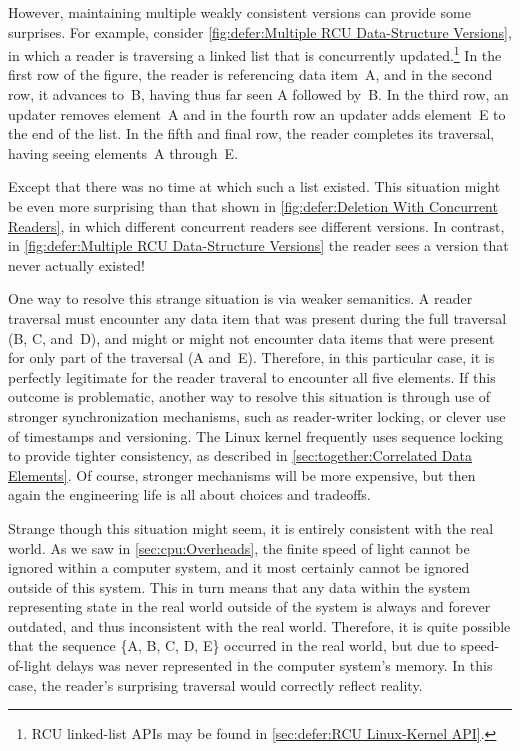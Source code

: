 However, maintaining multiple weakly consistent versions can provide
some surprises.
For example, consider
\cref{fig:defer:Multiple RCU Data-Structure Versions},
in which a reader is traversing a linked list that is concurrently
updated.\footnote{
	RCU linked-list APIs may be found in
	\cref{sec:defer:RCU Linux-Kernel API}.}
In the first row of the figure, the reader is referencing data item~A,
and in the second row, it advances to~B, having thus far seen A followed by~B\@.
In the third row, an updater removes element~A and in the fourth row
an updater adds element~E to the end of the list.
In the fifth and final row, the reader completes its traversal, having
seeing elements~A through~E\@.

Except that there was no time at which such a list existed.
This situation might be even more surprising than that shown in
\cref{fig:defer:Deletion With Concurrent Readers},
in which different concurrent readers see different versions.
In contrast, in
\cref{fig:defer:Multiple RCU Data-Structure Versions}
the reader sees a version that never actually existed!

One way to resolve this strange situation is via weaker semanitics.
A reader traversal must encounter any data item that was present
during the full traversal (B, C, and~D), and might or might not
encounter data items that were present for only part of the
traversal (A and~E)\@.
Therefore, in this particular case, it is perfectly legitimate for
the reader traveral to encounter all five elements.
If this outcome is problematic, another way to resolve this situation is
through use of stronger synchronization mechanisms, such as reader-writer
locking, or clever use of timestamps and versioning.
The Linux kernel frequently uses sequence locking to provide tighter
consistency, as described in \cref{sec:together:Correlated Data Elements}.
Of course, stronger mechanisms will be more expensive, but then again
the engineering life is all about choices and tradeoffs.

Strange though this situation might seem, it is entirely consistent with
the real world.
As we saw in
\cref{sec:cpu:Overheads},
the finite speed of light cannot be ignored within a computer system,
and it most certainly cannot be ignored outside of this system.
This in turn means that any data within the system representing state
in the real world outside of the system is always and forever outdated,
and thus inconsistent with the real world.
Therefore, it is quite possible that the sequence \{A, B, C, D, E\}
occurred in the real world, but due to speed-of-light delays was
never represented in the computer system's memory.
In this case, the reader's surprising traversal would correctly reflect
reality.

